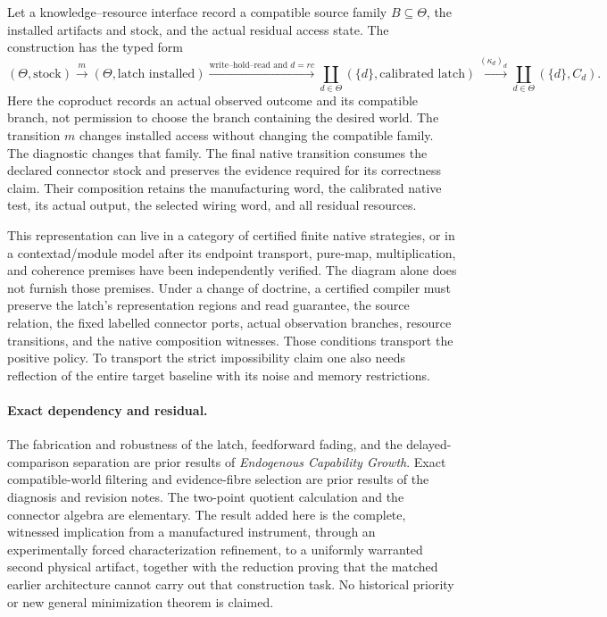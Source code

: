 \documentclass[11pt]{article}
\theoremstyle{definition}
\theoremstyle{remark}
\begin{document}
Let a knowledge--resource interface record a compatible source family
$B\subseteq\Theta$, the installed artifacts and stock, and the actual
residual access state. The construction has the typed form
\[
 (\Theta,\text{stock})
 \xrightarrow{m}
 (\Theta,\text{latch installed})
 \xrightarrow{\text{write--hold--read and }d=rc}
 \coprod_{d\in\Theta}(\{d\},\text{calibrated latch})
 \xrightarrow{(\kappa_d)_d}
 \coprod_{d\in\Theta}(\{d\},C_d).
\]
Here the coproduct records an actual observed outcome and its compatible
branch, not permission to choose the branch containing the desired
world. The transition $m$ changes installed access without changing the
compatible family. The diagnostic changes that family. The final native
transition consumes the declared connector stock and preserves the
evidence required for its correctness claim. Their composition retains
the manufacturing word, the calibrated native test, its actual output,
the selected wiring word, and all residual resources.

This representation can live in a category of certified finite native
strategies, or in a contextad/module model after its endpoint transport,
pure-map, multiplication, and coherence premises have been independently
verified. The diagram alone does not furnish those premises. Under a
change of doctrine, a certified compiler must preserve the latch's
representation regions and read guarantee, the source relation, the
fixed labelled connector ports, actual observation branches, resource
transitions, and the native composition witnesses. Those conditions
transport the positive policy. To transport the strict impossibility
claim one also needs reflection of the entire target baseline with its
noise and memory restrictions.

\paragraph{Exact dependency and residual.}
The fabrication and robustness of the latch, feedforward fading, and the
delayed-comparison separation are prior results of
\emph{Endogenous Capability Growth}. Exact compatible-world filtering and
evidence-fibre selection are prior results of the diagnosis and revision
notes. The two-point quotient calculation and the connector algebra are
elementary. The result added here is the complete, witnessed implication
from a manufactured instrument, through an experimentally forced
characterization refinement, to a uniformly warranted second physical
artifact, together with the reduction proving that the matched earlier
architecture cannot carry out that construction task. No historical
priority or new general minimization theorem is claimed.
\end{document}
